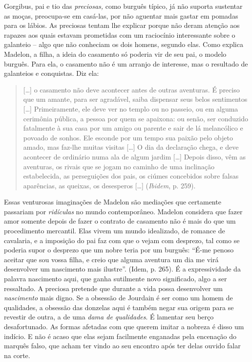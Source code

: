 Gorgibus, pai e tio das \emph{preciosas,} como burguês típico, já não
suporta sustentar as moças, preocupa-se em casá-las, por não aguentar
mais gastar em pomadas para os lábios. As preciosas tentam lhe explicar
porque não deram atenção aos rapazes aos quais estavam prometidas com um
raciocínio interessante sobre o galanteio -- algo que não conheciam os
dois homens, segundo elas. Como explica Madelon, a filha, a ideia do
casamento só poderia vir de seu pai, o modelo burguês. Para ela, o
casamento não é um arranjo de interesse, mas o resultado de galanteios e
conquistas. Diz ela:

\begin{quote}
{[}\ldots{}{]} o casamento não deve acontecer antes de outras aventuras.
É preciso que um amante, para ser agradável, saiba dispensar seus belos
sentimentos {[}\ldots{}{]} Primeiramente, ele deve ver no templo ou no
passeio, ou em alguma cerimônia pública, a pessoa por quem se apaixona:
ou senão, ser conduzido fatalmente à sua casa por um amigo ou parente e
sair de lá melancólico e povoado de sonhos. Ele esconde por um tempo sua
paixão pelo objeto amado, mas faz-lhe muitas visitas {[}\ldots{}{]} O
dia da declaração chega, e deve acontecer de ordinário numa ala de algum
jardim {[}\ldots{}{]} Depois disso, vêm as aventuras, os rivais que se
jogam no caminho de uma inclinação estabelecida, as perseguições dos
pais, os ciúmes concebidos sobre falsas aparências, as queixas, os
desesperos {[}\ldots{}{]} (\emph{Ibidem}, p. 259).
\end{quote}

Essas venturosas imaginações de Madelon são mediações que certamente
passariam por \emph{ridículas} no mundo contemporâneo. Madelon considera
que fazer amor somente depois de fazer o contrato de casamento não é
mais do que um procedimento mercantil. Elas vivem um mundo idealizado,
de romance de cavalaria, e a imposição do pai faz com que o vejam com
desprezo, tal como se poderia supor o desprezo que um nobre teria por um
burguês: ``É-me penoso aceitar que sou vossa filha, e creio que alguma
aventura um dia me virá desenvolver um nascimento mais ilustre''. (Idem,
p. 265). É a expressividade da palavra nascimento aqui, que ganha
sutilmente novo significado, algo a ser ressaltado. A preciosa pretende
que durante a vida possa desenvolver um \emph{nascimento} mais digno. Se
a obsessão de Jourdain é ser como um homem de qualidades, a obsessão das
donzelas aqui é também negar sua origem para se revestir de outra, a de
uma \emph{dama de qualidades}. É lamentar seu berço desafortunado. As
formas afetadas com que querem imitar a nobreza é disso um indício. E
não é acaso que elas sejam facilmente enganadas pela encenação do
marquês falso, que acham ter vindo ao seu encontro após ter delas ouvido
falar na corte.

